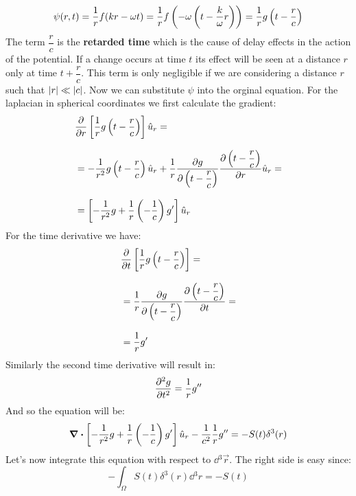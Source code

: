 \begin{equation}
  \psi(r,t) = \dfrac{1}{r} f(kr - \omega t) = \dfrac{1}{r} f\left(-\omega\left(t- \dfrac{k}{\omega}r\right)\right) = \dfrac{1}{r}g\left(t - \dfrac{r}{c}\right)
\end{equation}
The term $\dfrac{r}{c}$ is the \textbf{retarded time} which is the cause of delay effects in the action of the potential. If a change occurs at time $t$ its effect will be seen at a distance $r$ only at time $t + \dfrac{r}{c}$. This term is only negligible if we are considering a distance $r$ such that $\abs{r} \ll \abs{c}$.
Now we can substitute $\psi$ into the orginal equation. For the laplacian in spherical coordinates we first calculate the gradient:
\begin{equation}
  \begin{split}
    &\pdv{}{r}\left[\dfrac{1}{r}g\brackets{t - \dfrac{r}{c}}\right]\hat{u}_r =\\[8pt]
    &= -\dfrac{1}{r^2}g\brackets{t - \dfrac{r}{c}}\hat{u}_r + \dfrac{1}{r}\pdv{g}{\brackets{t - \dfrac{r}{c}}}\pdv{\brackets{t - \dfrac{r}{c}}}{r}\hat{u}_r =\\[8pt]
    &= \left[-\dfrac{1}{r^2}g + \dfrac{1}{r}\brackets{- \dfrac{1}{c}}g'\right]\hat{u}_r
  \end{split}
\end{equation}
For the time derivative we have:
\begin{equation}
  \begin{split}
    &\pdv{}{t}\left[\dfrac{1}{r}g\brackets{t - \dfrac{r}{c}}\right] =\\[8pt]
    &= \dfrac{1}{r}\pdv{g}{\brackets{t - \dfrac{r}{c}}}\pdv{\brackets{t - \dfrac{r}{c}}}{t} =\\[8pt]
    &=\dfrac{1}{r}g'
  \end{split}
\end{equation}
Similarly the second time derivative will result in:
\begin{equation}
  \pdv[2]{g}{t} = \dfrac{1}{r}g''
\end{equation}
And so the equation will be:
\begin{equation}
  \div{\left[-\dfrac{1}{r^2}g + \dfrac{1}{r}\left(- \dfrac{1}{c}\right)g'\right]}\hat{u}_r - \dfrac{1}{c^2}\dfrac{1}{r}g'' = -S(t)\delta^3(r)
\end{equation}
Let's now integrate this equation with respect to $\dd{^3\vec{r}}$.
The right side is easy since:
\begin{equation}
  -\int_{\Omega} S(t)\delta^3(r) \dd{^3 r} = -S(t)
\end{equation}
